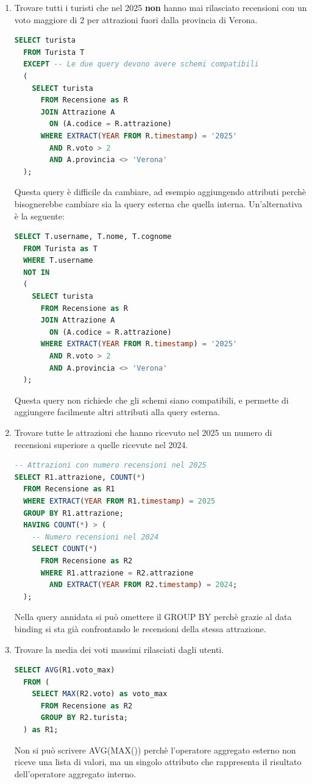 \documentclass[a4paper]{article}
\begin{document}
\begin{exercise}
\begin{enumerate}
    \item Trovare tutti i turisti che nel 2025 \textbf{non} hanno mai rilasciato
      recensioni con un voto maggiore di 2 per attrazioni fuori dalla provincia
      di Verona.
\begin{lstlisting}[language=SQL]
SELECT turista
  FROM Turista T
  EXCEPT -- Le due query devono avere schemi compatibili
  (
    SELECT turista
      FROM Recensione as R
      JOIN Attrazione A
        ON (A.codice = R.attrazione)
      WHERE EXTRACT(YEAR FROM R.timestamp) = '2025'
        AND R.voto > 2 
        AND A.provincia <> 'Verona'
  );
\end{lstlisting}
      Questa query è difficile da cambiare, ad esempio aggiungendo attributi perchè
      bisognerebbe cambiare sia la query esterna che quella interna.
      Un'alternativa è la seguente:
\begin{lstlisting}[language=SQL]
SELECT T.username, T.nome, T.cognome
  FROM Turista as T
  WHERE T.username
  NOT IN
  (
    SELECT turista
      FROM Recensione as R
      JOIN Attrazione A
        ON (A.codice = R.attrazione)
      WHERE EXTRACT(YEAR FROM R.timestamp) = '2025'
        AND R.voto > 2 
        AND A.provincia <> 'Verona'
  );
\end{lstlisting}
      Questa query non richiede che gli schemi siano compatibili, e permette di
      aggiungere facilmente altri attributi alla query esterna.

    \item Trovare tutte le attrazioni che hanno ricevuto nel 2025 un numero di
      recensioni superiore a quelle ricevute nel 2024.
\begin{lstlisting}[language=SQL]
-- Attrazioni con numero recensioni nel 2025
SELECT R1.attrazione, COUNT(*)
  FROM Recensione as R1
  WHERE EXTRACT(YEAR FROM R1.timestamp) = 2025
  GROUP BY R1.attrazione;
  HAVING COUNT(*) > (
    -- Numero recensioni nel 2024
    SELECT COUNT(*)
      FROM Recensione as R2
      WHERE R1.attrazione = R2.attrazione
        AND EXTRACT(YEAR FROM R2.timestamp) = 2024;
  );
\end{lstlisting}
      Nella query annidata si può omettere il GROUP BY perchè grazie al data binding
      si sta già confrontando le recensioni della stessa attrazione.

    \item Trovare la media dei voti massimi rilasciati dagli utenti.
\begin{lstlisting}[language=SQL]
SELECT AVG(R1.voto_max)
  FROM (
    SELECT MAX(R2.voto) as voto_max
      FROM Recensione as R2
      GROUP BY R2.turista;
  ) as R1;
\end{lstlisting}
      Non si può scrivere AVG(MAX()) perchè l'operatore aggregato esterno non riceve
      una lista di valori, ma un singolo attributo che rappresenta il risultato
      dell'operatore aggregato interno.

  \end{enumerate}
\end{exercise}
\end{document}
